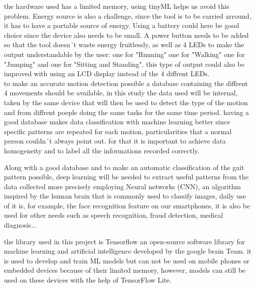 the hardware used has a limited memory, using tinyML helps us avoid this problem. 
Energy source is also a challenge, since the tool is to be carried arround, it has to have a portable source of energy. Using a battery could here be good choice since the device also needs to be small.
A power button needs to be added so that the tool doesn´t waste energy fruitlessly, as well as 4 LEDs to make the output understandable by the user: 
one for "Running" one for "Walking" one for "Jumping"  and one for "Sitting and Standing". this type of output could also be improved with using an LCD display instead of the 4 diffrent LEDs.\\
to make an accurate motion detection possible a database containing the diffrent 4 movements should be available, in this study the data used will be internal, taken by the same device that will then be used to detect the type of the motion and from diffrent poeple doing the same tasks for the same time period. having a good database makes data classification with machine learning better since specific patterns are repeated for each motion, particularities that a normal person couldn´t always point out. for that it is  important to achieve data homogeneity and to label all the informations recorded correctly.

Along with a good database and to make an automatic classification of the gait pattern possible, deep learning will be needed to extract useful patterns from the data collected more precisely employing Neural networks (CNN), an algorithm inspired by the human brain that is commonly used to classify images, daily use of it is, for example, the face recognition feature on our smartphones, it is also be used for other needs such as speech recognition, fraud detection, medical diagnosis...

the library used in this project is Tensorflow an open-source software library for machine learning and artificial intelligence developed by the google brain Team. it is used to develop and train ML models but can not be used on mobile phones or embedded devices because of their limited memory, however, models can still be used on these devices with the help of TensorFlow Lite.

